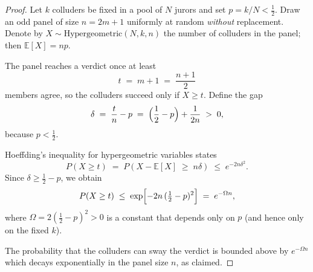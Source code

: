 \documentclass{article}
\begin{document}



\begin{proof}
Let \(k\) colluders be fixed in a pool of \(N\) jurors and set
\(p = k/N < \tfrac12\).
Draw an odd panel of size \(n = 2m+1\) uniformly at random
\emph{without} replacement.
Denote by $X \sim \mathrm{Hypergeometric}(N,k,n)$ the number of colluders in the panel; then
\(\mathbb{E}[X] = np\).

The panel reaches a verdict once at least
\[
  t \;=\; m+1 \;=\; \frac{n+1}{2}
\]
members agree, so the colluders succeed only if \(X \ge t\).
Define the gap
\[
  \delta
  \;=\;
  \frac{t}{n} - p
  \;=\;
  \Bigl(\dfrac12 - p\Bigr) + \frac{1}{2n}
  \;>\; 0,
\]
because \(p<\tfrac12\).

Hoeffding’s inequality for hypergeometric variables  
\cite{hoeffding1963, chavatal1979} states
\begin{equation*}
  P(X \ge t)
  \;=\;
  P\left(X - \mathbb{E}[X] \;\ge\; n\delta\right)
  \;\le\;
  e^{-2n\delta^{2}}.
\end{equation*}
Since \(\delta \ge \tfrac12 - p\), we obtain
\begin{equation*}
  P(X \ge t)
  \;\le\;
  \exp\Bigl[-2n\,(\tfrac12 - p)^{2}\Bigr]
  \;=\;
  e^{-\Omega n},
\end{equation*}
where \(\Omega = 2(\tfrac12 - p)^{2} > 0\) is a constant that depends only on
\(p\) (and hence only on the fixed \(k\)).

The probability that the colluders can sway the verdict is bounded above
by \(e^{-\Omega n}\) which decays exponentially in the panel size \(n\),
as claimed.
\end{proof}
\end{document}
